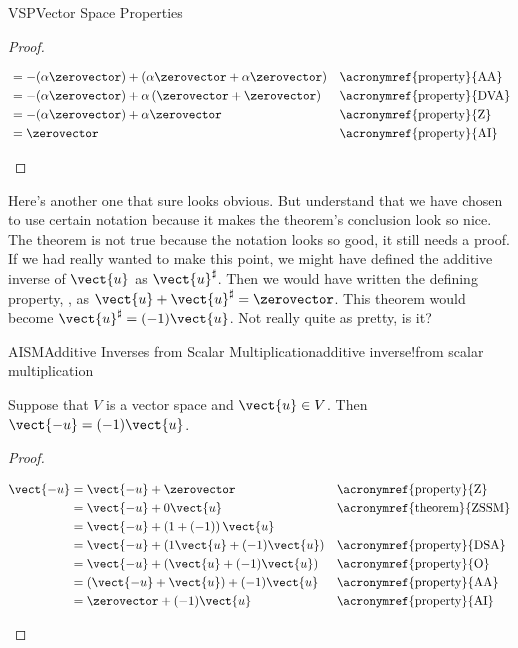 \begin{subsect}{VSP}{Vector Space Properties}
\begin{proof}
\begin{para}
\begin{align*}
&=-(\alpha\zerovector)+\left(\alpha\zerovector+\alpha\zerovector\right)&&\text{\acronymref{property}{AA}}\\
&=-(\alpha\zerovector)+\alpha\left(\zerovector+\zerovector\right)&&\text{\acronymref{property}{DVA}}\\
&=-(\alpha\zerovector)+\alpha\zerovector&&\text{\acronymref{property}{Z}}\\
&=\zerovector&&\text{\acronymref{property}{AI}}
\end{align*}\end{para}
%
\end{proof}
%
\begin{para}Here's another one that sure looks obvious.  But understand that we have chosen to use certain notation because it makes the theorem's conclusion look so nice.  The theorem is not true because the notation looks so good, it still needs a proof.  If we had really wanted to make this point, we might have defined the additive inverse of $\vect{u}$ as $\vect{u}^\sharp$.  Then we would have written the defining property, , as $\vect{u}+\vect{u}^\sharp=\zerovector$.  This theorem would become $\vect{u}^\sharp=(-1)\vect{u}$.  Not really quite as pretty, is it?\end{para}
%
\begin{theorem}{AISM}{Additive Inverses from Scalar Multiplication}{additive inverse!from scalar multiplication}
%
\begin{para}Suppose that $V$ is a vector space and $\vect{u}\in V$.  Then $\vect{-u}=(-1)\vect{u}$.\end{para}
\end{theorem}
%
\begin{proof}
%
\begin{para}\begin{align*}
\vect{-u}
&=\vect{-u}+\zerovector&&\text{\acronymref{property}{Z}}\\
&=\vect{-u}+0\vect{u}&&\text{\acronymref{theorem}{ZSSM}}\\
&=\vect{-u}+\left(1+(-1)\right)\vect{u}\\
&=\vect{-u}+\left(1\vect{u}+(-1)\vect{u}\right)&&\text{\acronymref{property}{DSA}}\\
&=\vect{-u}+\left(\vect{u}+(-1)\vect{u}\right)&&\text{\acronymref{property}{O}}\\
&=\left(\vect{-u}+\vect{u}\right)+(-1)\vect{u}&&\text{\acronymref{property}{AA}}\\
&=\zerovector+(-1)\vect{u}&&\text{\acronymref{property}{AI}}\\

\end{align*}
\end{para}
\end{proof}
\end{subsect}
